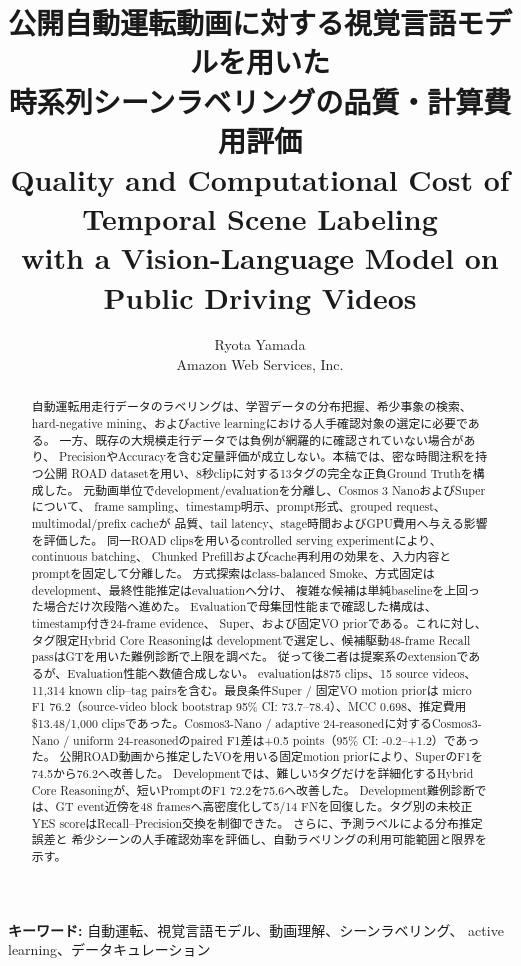 \documentclass[9pt,a4paper]{extarticle}
\title{\bfseries 公開自動運転動画に対する視覚言語モデルを用いた\\
時系列シーンラベリングの品質・計算費用評価\\[2pt]
\large Quality and Computational Cost of Temporal Scene Labeling\\
with a Vision-Language Model on Public Driving Videos}
\author{Ryota Yamada\\{\small Amazon Web Services, Inc.}}
\date{}
\begin{document}
\maketitle
\begin{abstract}
自動運転用走行データのラベリングは、学習データの分布把握、希少事象の検索、
hard-negative mining、およびactive learningにおける人手確認対象の選定に必要である。
一方、既存の大規模走行データでは負例が網羅的に確認されていない場合があり、
PrecisionやAccuracyを含む定量評価が成立しない。本稿では、密な時間注釈を持つ公開
ROAD datasetを用い、8秒clipに対する13タグの完全な正負Ground Truthを構成した。
元動画単位でdevelopment/evaluationを分離し、Cosmos 3 NanoおよびSuperについて、
frame sampling、timestamp明示、prompt形式、grouped request、multimodal/prefix cacheが
品質、tail latency、stage時間およびGPU費用へ与える影響を評価した。
同一ROAD clipsを用いるcontrolled serving experimentにより、continuous batching、
Chunked Prefillおよびcache再利用の効果を、入力内容とpromptを固定して分離した。
方式探索はclass-balanced Smoke、方式固定はdevelopment、最終性能推定はevaluationへ分け、
複雑な候補は単純baselineを上回った場合だけ次段階へ進めた。
Evaluationで母集団性能まで確認した構成は、timestamp付き24-frame evidence、
Super、および固定VO priorである。これに対し、タグ限定Hybrid Core Reasoningは
developmentで選定し、候補駆動48-frame Recall passはGTを用いた難例診断で上限を調べた。
従って後二者は提案系のextensionであるが、Evaluation性能へ数値合成しない。
evaluationは875 clips、15 source videos、
11,314 known clip--tag pairsを含む。最良条件Super / 固定VO motion priorは
micro F1 76.2（source-video block bootstrap 95\% CI:
73.7--78.4）、MCC 0.698、推定費用
\$13.48/1,000 clipsであった。Cosmos3-Nano / adaptive 24-reasonedに対するCosmos3-Nano / uniform 24-reasonedのpaired F1差は+0.5 points（95\% CI: -0.2--+1.2）であった。
公開ROAD動画から推定したVOを用いる固定motion priorにより、SuperのF1を74.5から76.2へ改善した。
Developmentでは、難しい5タグだけを詳細化するHybrid Core Reasoningが、短いPromptのF1 72.2を75.6へ改善した。
Development難例診断では、GT event近傍を48 framesへ高密度化して5/14 FNを回復した。タグ別の未校正YES scoreはRecall--Precision交換を制御できた。
さらに、予測ラベルによる分布推定誤差と
希少シーンの人手確認効率を評価し、自動ラベリングの利用可能範囲と限界を示す。
\end{abstract}

\noindent\textbf{キーワード:} 自動運転、視覚言語モデル、動画理解、シーンラベリング、
active learning、データキュレーション
\end{document}
